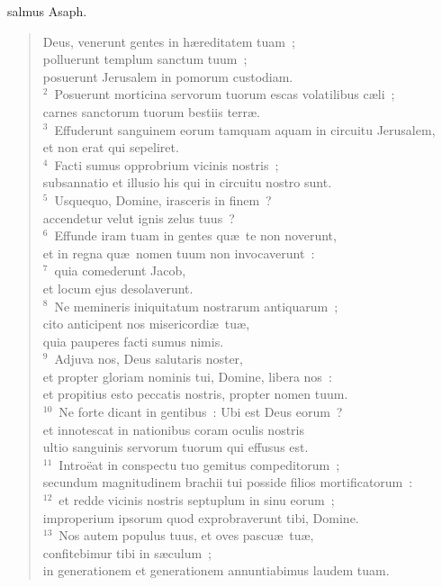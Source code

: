 \bchapter
{}salmus Asaph. \begin{flushleft}\begin{verse}\vspace{6pt}Deus, venerunt gentes in h\ae reditatem tuam~;\\ polluerunt templum sanctum tuum~;\\ posuerunt Jerusalem in pomorum custodiam.\\
${}^{2}$~Posuerunt morticina servorum tuorum escas volatilibus c\ae li~;\\ carnes sanctorum tuorum bestiis terr\ae .\\
${}^{3}$~Effuderunt sanguinem eorum tamquam aquam in circuitu Jerusalem,\\ et non erat qui sepeliret.\\
${}^{4}$~Facti sumus opprobrium vicinis nostris~;\\ subsannatio et illusio his qui in circuitu nostro sunt.\\
${}^{5}$~Usquequo, Domine, irasceris in finem~?\\ accendetur velut ignis zelus tuus~?\\
${}^{6}$~Effunde iram tuam in gentes qu\ae\ te non noverunt,\\ et in regna qu\ae\ nomen tuum non invocaverunt~:\\
${}^{7}$~quia comederunt Jacob,\\ et locum ejus desolaverunt.\\
${}^{8}$~Ne memineris iniquitatum nostrarum antiquarum~;\\ cito anticipent nos misericordi\ae\ tu\ae ,\\ quia pauperes facti sumus nimis.\\
${}^{9}$~Adjuva nos, Deus salutaris noster,\\ et propter gloriam nominis tui, Domine, libera nos~:\\ et propitius esto peccatis nostris, propter nomen tuum.\\
${}^{10}$~Ne forte dicant in gentibus~: Ubi est Deus eorum~?\\ et innotescat in nationibus coram oculis nostris\\ ultio sanguinis servorum tuorum qui effusus est.\\
${}^{11}$~Intro\"eat in conspectu tuo gemitus compeditorum~;\\ secundum magnitudinem brachii tui posside filios mortificatorum~:\\
${}^{12}$~et redde vicinis nostris septuplum in sinu eorum~;\\ improperium ipsorum quod exprobraverunt tibi, Domine.\\
${}^{13}$~Nos autem populus tuus, et oves pascu\ae\ tu\ae ,\\ confitebimur tibi in s\ae culum~;\\ in generationem et generationem annuntiabimus laudem tuam.\end{verse}\end{flushleft}



